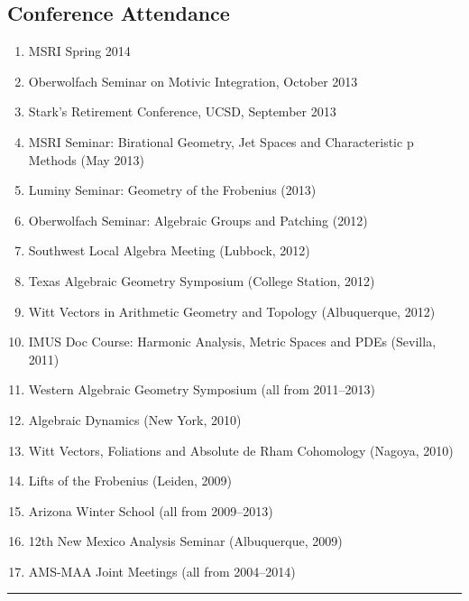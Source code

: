 \documentclass[a4paper,10pt]{article}
\begin{document}
\subsection*{Conference Attendance }
\begin{enumerate}
\item MSRI Spring 2014
\item Oberwolfach Seminar on Motivic Integration, October 2013
\item Stark's Retirement Conference, UCSD, September 2013
\item MSRI Seminar: Birational Geometry, Jet Spaces and  Characteristic p Methods (May 2013)
\item  Luminy Seminar: Geometry of the Frobenius (2013)
 \item Oberwolfach Seminar: Algebraic Groups and Patching (2012)
 \item Southwest Local Algebra Meeting (Lubbock, 2012)
 \item Texas Algebraic Geometry Symposium (College Station, 2012)
 \item Witt Vectors in Arithmetic Geometry and Topology (Albuquerque, 2012)
 \item IMUS Doc Course: Harmonic Analysis, Metric Spaces and PDEs (Sevilla, 2011)
 \item Western Algebraic Geometry Symposium (all from 2011--2013)
 \item Algebraic Dynamics (New York, 2010)
 \item Witt Vectors, Foliations and Absolute de Rham Cohomology (Nagoya, 2010)
 \item Lifts of the Frobenius (Leiden, 2009)
 \item Arizona Winter School (all from 2009--2013)
 \item 12th New Mexico Analysis Seminar (Albuquerque, 2009)
 \item AMS-MAA Joint Meetings (all from 2004--2014)
\end{enumerate}
\fi



\vspace{2ex}
\noindent\rule{\linewidth}{0.4pt}
\end{document}
